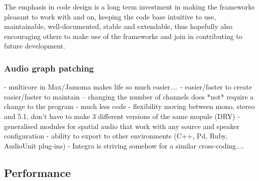 \documentclass[twoside,a4paper]{article}
\begin{document}
The emphasis in code design is a long term investment in making the frameworks pleasant to work with and on, keeping the code base intuitive to use, maintainable, well-documented, stable and extendable, thus hopefully also encouraging others to make use of the frameworks and join in contributing to future development.



%
%
%


\subsubsection{Audio graph patching} %


- multicore in Max/Jamoma makes life so much easier....
- easier/faster to create easier/faster to maintain -- changing the number of channels does *not* require a change to the program
- much less code
- flexibility moving between mono, stereo and 5.1, don't have to make 3 different versions of the same mopule (DRY)
- generalised modules for spatial audio that work with any source and speaker configuration
- ability to export to other environments (C++, Pd, Ruby, AudioUnit plug-ins)
- Integra is striving somehow for a similar cross-coding....



\subsection{Performance} %
\end{document}
